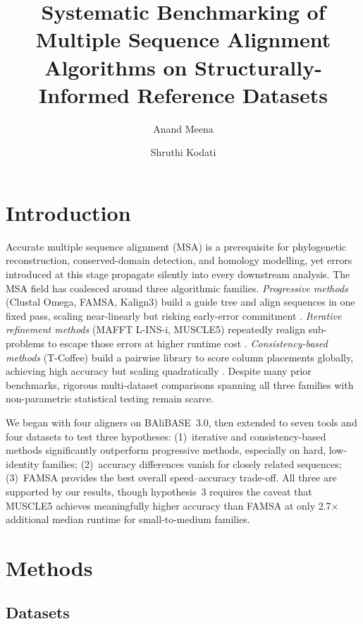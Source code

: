 \documentclass[unnumsec,webpdf,contemporary,large]{oup-authoring-template}
\title[MSA Benchmark]{Systematic Benchmarking of Multiple Sequence Alignment
    Algorithms on Structurally-Informed Reference Datasets}
\author[1]{Anand Meena}
\author[1]{Shruthi Kodati}
\begin{document}
\maketitle

\section{Introduction}

Accurate multiple sequence alignment (MSA) is a prerequisite for
phylogenetic reconstruction, conserved-domain detection, and homology
modelling, yet errors introduced at this stage propagate silently into
every downstream analysis.
The MSA field has coalesced around three algorithmic families.
\emph{Progressive methods} (Clustal Omega, FAMSA, Kalign3) build a guide
tree and align sequences in one fixed pass, scaling near-linearly but
risking early-error commitment
\citep{sievers2011clustalo,deorowicz2016famsa,lassmann2020kalign3}.
\emph{Iterative refinement methods} (MAFFT L-INS-i, MUSCLE5) repeatedly
realign sub-problems to escape those errors at higher runtime cost
\citep{katoh2013mafft,edgar2022muscle5}.
\emph{Consistency-based methods} (T-Coffee) build a pairwise library to
score column placements globally, achieving high accuracy but scaling
quadratically \citep{notredame2000tcoffee}.
Despite many prior benchmarks, rigorous multi-dataset comparisons spanning
all three families with non-parametric statistical testing remain scarce.

We began with four aligners on BAliBASE~3.0, then extended to seven tools
and four datasets to test three hypotheses: (1)~iterative and
consistency-based methods significantly outperform progressive methods,
especially on hard, low-identity families; (2)~accuracy differences vanish
for closely related sequences; (3)~FAMSA provides the best overall
speed--accuracy trade-off.
All three are supported by our results, though hypothesis~3 requires the
caveat that MUSCLE5 achieves meaningfully higher accuracy than FAMSA at
only 2.7$\times$ additional median runtime for small-to-medium families.

\section{Methods}

\subsection{Datasets}
\end{document}
